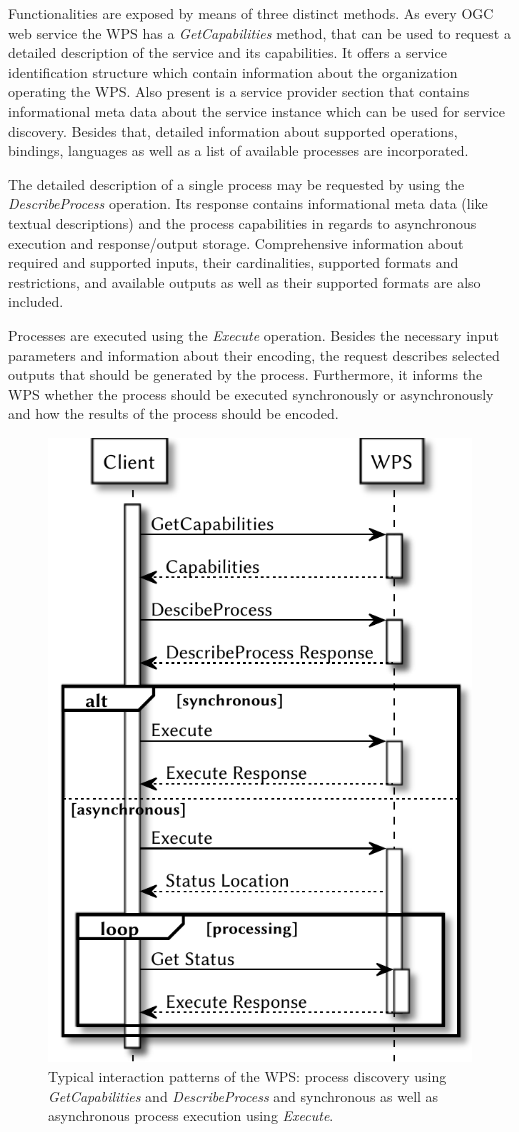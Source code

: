   Functionalities are exposed by means of three distinct methods. As every \ac{OGC} web service the \ac{WPS} has a \emph{GetCapabilities} method, that can be used to request a detailed description of the service and its capabilities. It offers a service identification structure which contain information about the organization operating the \ac{WPS}. Also present is a service provider section that contains informational meta data about the service instance which can be used for service discovery. Besides that, detailed information about supported operations, bindings, languages as well as a list of available processes are incorporated.

  The detailed description of a single process may be requested by using the \emph{DescribeProcess} operation. Its response contains informational meta data (like textual descriptions) and the process capabilities in regards to asynchronous execution and response/output storage. Comprehensive information about required and supported inputs, their cardinalities, supported formats and restrictions, and available outputs as well as their supported formats are also included.

  Processes are executed using the \emph{Execute} operation. Besides the necessary input parameters and information about their encoding, the request describes selected outputs that should be generated by the process. Furthermore, it informs the \ac{WPS} whether the process should be executed synchronously or asynchronously and how the results of the process should be encoded.

  \begin{figure}[!htb]
    \centering
    \includegraphics[width=0.40140845070422537\linewidth]{figures/sequence-diagramm-wps.pdf}
    \caption{\label{fig:sd:wps}Typical interaction patterns of the \acl{WPS}: process discovery using \emph{GetCapabilities} and \emph{DescribeProcess} and synchronous as well as asynchronous process execution using \emph{Execute}.}
  \end{figure}

